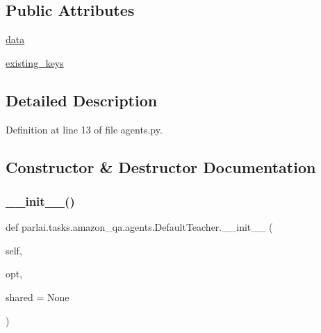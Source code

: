 \subsection*{Public Attributes}
\begin{DoxyCompactItemize}
\item 
\hyperlink{classparlai_1_1tasks_1_1amazon__qa_1_1agents_1_1DefaultTeacher_a0ab774418f9f5f77d354150198212d4e}{data}
\item 
\hyperlink{classparlai_1_1tasks_1_1amazon__qa_1_1agents_1_1DefaultTeacher_a7d3a8cac76a5dcbdc7aecc9376f79bc9}{existing\+\_\+keys}
\end{DoxyCompactItemize}


\subsection{Detailed Description}


Definition at line 13 of file agents.\+py.



\subsection{Constructor \& Destructor Documentation}
\mbox{\label{classparlai_1_1tasks_1_1amazon__qa_1_1agents_1_1DefaultTeacher_a6fd5b4e1c7ac8e4572c46873b6f0b9b4}} 
\subsubsection{\texorpdfstring{\+\_\+\+\_\+init\+\_\+\+\_\+()}{\_\_init\_\_()}}
{\footnotesize\ttfamily def parlai.\+tasks.\+amazon\+\_\+qa.\+agents.\+Default\+Teacher.\+\_\+\+\_\+init\+\_\+\+\_\+ (\begin{DoxyParamCaption}\item[{}]{self,  }\item[{}]{opt,  }\item[{}]{shared = {\ttfamily None} }\end{DoxyParamCaption})}



